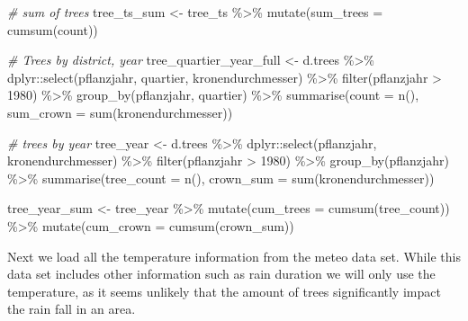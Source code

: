 \documentclass[
]{article}
\newenvironment{Shaded}{\begin{snugshade}}{\end{snugshade}}
\newcommand{\AttributeTok}[1]{\textcolor[rgb]{0.77,0.63,0.00}{#1}}
\newcommand{\CommentTok}[1]{\textcolor[rgb]{0.56,0.35,0.01}{\textit{#1}}}
\newcommand{\DecValTok}[1]{\textcolor[rgb]{0.00,0.00,0.81}{#1}}
\newcommand{\FunctionTok}[1]{\textcolor[rgb]{0.00,0.00,0.00}{#1}}
\newcommand{\NormalTok}[1]{#1}
\newcommand{\OtherTok}[1]{\textcolor[rgb]{0.56,0.35,0.01}{#1}}
\newcommand{\SpecialCharTok}[1]{\textcolor[rgb]{0.00,0.00,0.00}{#1}}
\begin{document}
\begin{Shaded}
\begin{Highlighting}[]
\CommentTok{\# sum of trees}
\NormalTok{tree\_ts\_sum }\OtherTok{\textless{}{-}}\NormalTok{ tree\_ts }\SpecialCharTok{\%\textgreater{}\%}
 \FunctionTok{mutate}\NormalTok{(}\AttributeTok{sum\_trees =} \FunctionTok{cumsum}\NormalTok{(count))}


\CommentTok{\# Trees by district, year}
\NormalTok{tree\_quartier\_year\_full }\OtherTok{\textless{}{-}}\NormalTok{ d.trees }\SpecialCharTok{\%\textgreater{}\%}
\NormalTok{  dplyr}\SpecialCharTok{::}\FunctionTok{select}\NormalTok{(pflanzjahr, quartier, kronendurchmesser) }\SpecialCharTok{\%\textgreater{}\%}
  \FunctionTok{filter}\NormalTok{(pflanzjahr }\SpecialCharTok{\textgreater{}} \DecValTok{1980}\NormalTok{) }\SpecialCharTok{\%\textgreater{}\%}
  \FunctionTok{group\_by}\NormalTok{(pflanzjahr, quartier) }\SpecialCharTok{\%\textgreater{}\%}
  \FunctionTok{summarise}\NormalTok{(}\AttributeTok{count =} \FunctionTok{n}\NormalTok{(), }\AttributeTok{sum\_crown =} \FunctionTok{sum}\NormalTok{(kronendurchmesser))}

\CommentTok{\# trees by year}
\NormalTok{tree\_year }\OtherTok{\textless{}{-}}\NormalTok{ d.trees }\SpecialCharTok{\%\textgreater{}\%}
\NormalTok{  dplyr}\SpecialCharTok{::}\FunctionTok{select}\NormalTok{(pflanzjahr, kronendurchmesser) }\SpecialCharTok{\%\textgreater{}\%}
  \FunctionTok{filter}\NormalTok{(pflanzjahr }\SpecialCharTok{\textgreater{}} \DecValTok{1980}\NormalTok{) }\SpecialCharTok{\%\textgreater{}\%}
  \FunctionTok{group\_by}\NormalTok{(pflanzjahr) }\SpecialCharTok{\%\textgreater{}\%}
  \FunctionTok{summarise}\NormalTok{(}\AttributeTok{tree\_count =} \FunctionTok{n}\NormalTok{(), }\AttributeTok{crown\_sum =} \FunctionTok{sum}\NormalTok{(kronendurchmesser))}

\NormalTok{tree\_year\_sum }\OtherTok{\textless{}{-}}\NormalTok{ tree\_year }\SpecialCharTok{\%\textgreater{}\%}
  \FunctionTok{mutate}\NormalTok{(}\AttributeTok{cum\_trees =} \FunctionTok{cumsum}\NormalTok{(tree\_count)) }\SpecialCharTok{\%\textgreater{}\%}
  \FunctionTok{mutate}\NormalTok{(}\AttributeTok{cum\_crown =} \FunctionTok{cumsum}\NormalTok{(crown\_sum))}
\end{Highlighting}
\end{Shaded}

Next we load all the temperature information from the meteo data set.
While this data set includes other information such as rain duration we
will only use the temperature, as it seems unlikely that the amount of
trees significantly impact the rain fall in an area.
\end{document}

